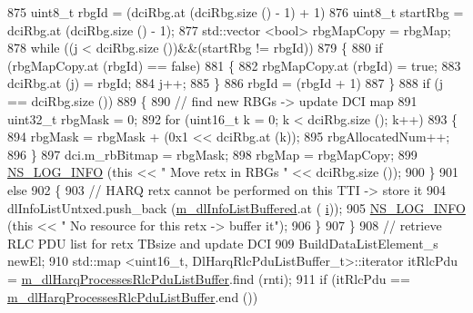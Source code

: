 \begin{DoxyCode}
875               uint8\_t rbgId = (dciRbg.at (dciRbg.size () - 1) + 1) %
876               uint8\_t startRbg = dciRbg.at (dciRbg.size () - 1);
877               std::vector <bool> rbgMapCopy = rbgMap;
878               \textcolor{keywordflow}{while} ((j < dciRbg.size ())&&(startRbg != rbgId))
879                 \{
880                   \textcolor{keywordflow}{if} (rbgMapCopy.at (rbgId) == \textcolor{keyword}{false})
881                     \{
882                       rbgMapCopy.at (rbgId) = \textcolor{keyword}{true};
883                       dciRbg.at (j) = rbgId;
884                       j++;
885                     \}
886                   rbgId = (rbgId + 1) %
887                 \}
888               \textcolor{keywordflow}{if} (j == dciRbg.size ())
889                 \{
890                   \textcolor{comment}{// find new RBGs -> update DCI map}
891                   uint32\_t rbgMask = 0;
892                   \textcolor{keywordflow}{for} (uint16\_t k = 0; k < dciRbg.size (); k++)
893                     \{
894                       rbgMask = rbgMask + (0x1 << dciRbg.at (k));
895                       rbgAllocatedNum++;
896                     \}
897                   dci.m\_rbBitmap = rbgMask;
898                   rbgMap = rbgMapCopy;
899                   \hyperlink{group__logging_gafbd73ee2cf9f26b319f49086d8e860fb}{NS\_LOG\_INFO} (\textcolor{keyword}{this} << \textcolor{stringliteral}{" Move retx in RBGs "} << dciRbg.size ());
900                 \}
901               \textcolor{keywordflow}{else}
902                 \{
903                   \textcolor{comment}{// HARQ retx cannot be performed on this TTI -> store it}
904                   dlInfoListUntxed.push\_back (\hyperlink{classns3_1_1TtaFfMacScheduler_af7afa3d5a610456175b21bad17cc04ae}{m\_dlInfoListBuffered}.at (
      \hyperlink{bernuolliDistribution_8m_a6f6ccfcf58b31cb6412107d9d5281426}{i}));
905                   \hyperlink{group__logging_gafbd73ee2cf9f26b319f49086d8e860fb}{NS\_LOG\_INFO} (\textcolor{keyword}{this} << \textcolor{stringliteral}{" No resource for this retx -> buffer it"});
906                 \}
907             \}
908           \textcolor{comment}{// retrieve RLC PDU list for retx TBsize and update DCI}
909           BuildDataListElement\_s newEl;
910           std::map <uint16\_t, DlHarqRlcPduListBuffer\_t>::iterator itRlcPdu =  
      \hyperlink{classns3_1_1TtaFfMacScheduler_a04e2e36b8114bfe977b8a3443822d7f1}{m\_dlHarqProcessesRlcPduListBuffer}.find (rnti);
911           \textcolor{keywordflow}{if} (itRlcPdu == \hyperlink{classns3_1_1TtaFfMacScheduler_a04e2e36b8114bfe977b8a3443822d7f1}{m\_dlHarqProcessesRlcPduListBuffer}.end ())

\end{DoxyCode}
